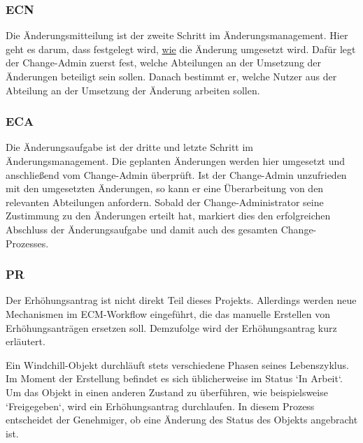 \subsubsection{\acl{ECN}}
Die Änderungsmitteilung ist der zweite Schritt im Änderungsmanagement.
Hier geht es darum, dass festgelegt wird, \underline{wie} die Änderung umgesetzt wird.
Dafür legt der Change-Admin zuerst fest, welche Abteilungen an der Umsetzung der Änderungen beteiligt sein sollen.
Danach bestimmt er, welche Nutzer aus der Abteilung an der Umsetzung der Änderung arbeiten sollen.

\subsubsection{\acl{ECA}}
Die Änderungsaufgabe ist der dritte und letzte Schritt im Änderungsmanagement.
Die geplanten Änderungen werden hier umgesetzt und anschließend vom Change-Admin überprüft.
Ist der Change-Admin unzufrieden mit den umgesetzten Änderungen, so kann er eine Überarbeitung von den relevanten Abteilungen anfordern.
Sobald der Change-Administrator seine Zustimmung zu den Änderungen erteilt hat, markiert dies den erfolgreichen Abschluss der Änderungsaufgabe und damit auch des gesamten Change-Prozesses.

\subsubsection{\acl{PR}}
Der Erhöhungsantrag ist nicht direkt Teil dieses Projekts.
Allerdings werden neue Mechanismen im \ac{ECM}-Workflow eingeführt, die das manuelle Erstellen von Erhöhungsanträgen ersetzen soll.
Demzufolge wird der Erhöhungsantrag kurz erläutert.

Ein Windchill-Objekt durchläuft stets verschiedene Phasen seines Lebenszyklus.
Im Moment der Erstellung befindet es sich üblicherweise im Status `In Arbeit`.
Um das Objekt in einen anderen Zustand zu überführen, wie beispielsweise `Freigegeben`, wird ein Erhöhungsantrag durchlaufen.
In diesem Prozess entscheidet der Genehmiger, ob eine Änderung des Status des Objekts angebracht ist.